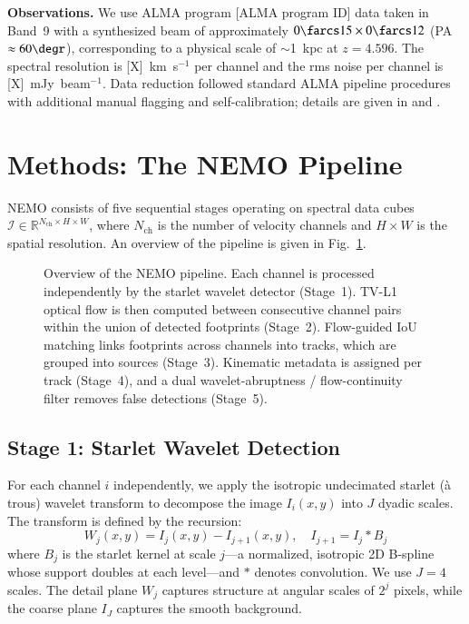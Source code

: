 \documentclass{aa}
\begin{document}
\textbf{Observations.} We use ALMA program [ALMA program ID] data taken in Band~9 with a synthesized beam of approximately $0\farcs15 \times 0\farcs12$ (PA $\approx 60\degr$), corresponding to a physical scale of $\sim$1~kpc at $z = 4.596$. The spectral resolution is [X]~km~s$^{-1}$ per channel and the rms noise per channel is [X]~mJy~beam$^{-1}$. Data reduction followed standard ALMA pipeline procedures with additional manual flagging and self-calibration; details are given in \citet{DiazSantos+2018} and \citet{...}.

\section{Methods: The NEMO Pipeline}
\label{sec:methods}

NEMO consists of five sequential stages operating on spectral data cubes $\mathcal{I} \in \mathbb{R}^{N_{\text{ch}} \times H \times W}$, where $N_{\text{ch}}$ is the number of velocity channels and $H \times W$ is the spatial resolution. An overview of the pipeline is given in Fig.~\ref{fig:nemo_overview}.

\begin{figure}
  \centering
  \caption{Overview of the NEMO pipeline. Each channel is processed independently by the starlet wavelet detector (Stage~1). TV-L1 optical flow is then computed between consecutive channel pairs within the union of detected footprints (Stage~2). Flow-guided IoU matching links footprints across channels into tracks, which are grouped into sources (Stage~3). Kinematic metadata is assigned per track (Stage~4), and a dual wavelet-abruptness / flow-continuity filter removes false detections (Stage~5).}
  \label{fig:nemo_overview}
\end{figure}

\subsection{Stage 1: Starlet Wavelet Detection}
\label{sec:method_wavelet}

For each channel $i$ independently, we apply the isotropic undecimated starlet (à trous) wavelet transform \citep{Starck+2007} to decompose the image $I_i(x,y)$ into $J$ dyadic scales. The transform is defined by the recursion:
\begin{equation}
  W_j(x,y) = I_j(x,y) - I_{j+1}(x,y), \quad I_{j+1} = I_j * B_j
\end{equation}
where $B_j$ is the starlet kernel at scale $j$---a normalized, isotropic 2D B-spline whose support doubles at each level---and $*$ denotes convolution. We use $J=4$ scales. The detail plane $W_j$ captures structure at angular scales of $2^j$ pixels, while the coarse plane $I_J$ captures the smooth background.
\end{document}
